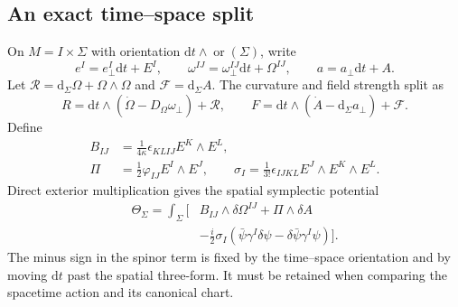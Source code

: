 \subsection{An exact time--space split}
On $M=I\times\Sigma$ with orientation $\mathrm dt\wedge\operatorname{or}(\Sigma)$, write
\begin{equation}
 e^I=e_\perp^I\mathrm dt+E^I,\qquad
 \omega^{IJ}=\omega_\perp^{IJ}\mathrm dt+\Omega^{IJ},\qquad
 a=a_\perp\mathrm dt+A.
\end{equation}
Let $\mathcal R=\mathrm d_\Sigma\Omega+\Omega\wedge\Omega$ and $\mathcal F=\mathrm d_\Sigma A$. The curvature and field strength split as
\begin{equation}
 R=\mathrm dt\wedge(\dot\Omega-D_\Omega\omega_\perp)+\mathcal R,
 \qquad
 F=\mathrm dt\wedge(\dot A-\mathrm d_\Sigma a_\perp)+\mathcal F.
\end{equation}
Define
\begin{align}
 B_{IJ}&=\tfrac1{4\kappa}\epsilon_{KLIJ}E^K\wedge E^L,\\
 \Pi&=\tfrac12\varphi_{IJ}E^I\wedge E^J,\qquad
 \sigma_I=\tfrac1{3!}\epsilon_{IJKL}E^J\wedge E^K\wedge E^L.
\end{align}
Direct exterior multiplication gives the spatial symplectic potential
\begin{equation}
 \begin{aligned}
 \Theta_\Sigma=\int_\Sigma\bigl[&B_{IJ}\wedge\delta\Omega^{IJ}+\Pi\wedge\delta A\\
 &-\tfrac i2\sigma_I(\bar\psi\gamma^I\delta\psi
                         -\delta\bar\psi\gamma^I\psi)\bigr].
 \end{aligned}
 \label{c:constraints:boundary-potential}
\end{equation}
The minus sign in the spinor term is fixed by the time--space orientation and by moving $\mathrm dt$ past the spatial three-form. It must be retained when comparing the spacetime action and its canonical chart.

